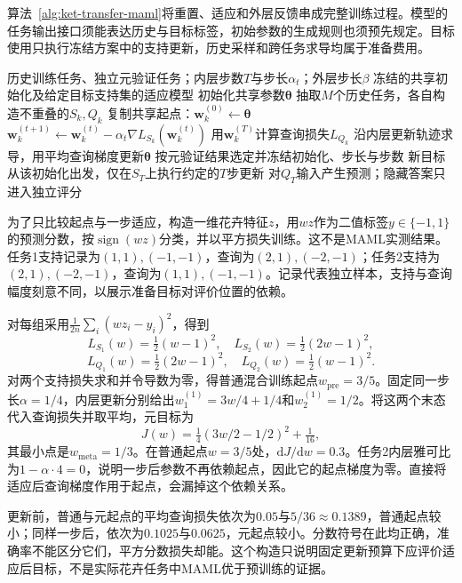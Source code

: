 算法~\ref{alg:ket-transfer-maml}将重置、适应和外层反馈串成完整训练过程。模型的任务输出接口须能表达历史与目标标签，初始参数的生成规则也须预先规定。目标使用只执行冻结方案中的支持更新，历史采样和跨任务求导均属于准备费用。

\begin{algorithm}[MAML的准备与目标适应]
  \label{alg:ket-transfer-maml}
  \begin{algorithmic}[1]
    \Require 历史训练任务、独立元验证任务；内层步数$T$与步长$\alpha_t$；外层步长$\beta$
    \Ensure 冻结的共享初始化及给定目标支持集的适应模型
    \State 初始化共享参数$\bm{\theta}$
      \State 抽取$M$个历史任务，各自构造不重叠的$S_k,Q_k$
        \State 复制共享起点：$\bm w_k^{(0)}\gets\bm{\theta}$
          \State $\bm w_k^{(t+1)}\gets\bm w_k^{(t)}
            -\alpha_t\nabla L_{S_k}(\bm w_k^{(t)})$
        \EndFor
        \State 用$\bm w_k^{(T)}$计算查询损失$L_{Q_k}$
      \EndFor
      \State 沿内层更新轨迹求导，用平均查询梯度更新$\bm{\theta}$
    \EndWhile
    \State 按元验证结果选定并冻结初始化、步长与步数
    \State 新目标从该初始化出发，仅在$S_T$上执行约定的$T$步更新
    \State 对$Q_T$输入产生预测；隐藏答案只进入独立评分
  \end{algorithmic}
\end{algorithm}

\begin{example}[同一组分类任务中的起点与适应后损失]
  \label{ex:ket-transfer-maml-numeric}
  为了只比较起点与一步适应，构造一维花卉特征$z$，用$wz$作为二值标签$y\in\{-1,1\}$的预测分数，按$\operatorname{sign}(wz)$分类，并以平方损失训练。这不是MAML实测结果。任务1支持记录为$(1,1),(-1,-1)$，查询为$(2,1),(-2,-1)$；任务2支持为$(2,1),(-2,-1)$，查询为$(1,1),(-1,-1)$。记录代表独立样本，支持与查询幅度刻意不同，以展示准备目标对评价位置的依赖。

  对每组采用$\frac{1}{2n}\sum_i(wz_i-y_i)^2$，得到
  \[
    L_{S_1}(w)=\tfrac12(w-1)^2,\quad
    L_{S_2}(w)=\tfrac12(2w-1)^2,
  \]
  \[
    L_{Q_1}(w)=\tfrac12(2w-1)^2,\quad
    L_{Q_2}(w)=\tfrac12(w-1)^2.
  \]
  对两个支持损失求和并令导数为零，得普通混合训练起点$w_{\mathrm{pre}}=3/5$。固定同一步长$\alpha=1/4$，内层更新分别给出$w_1^{(1)}=3w/4+1/4$和$w_2^{(1)}=1/2$。将这两个末态代入查询损失并取平均，元目标为
  \[
    J(w)=\tfrac14(3w/2-1/2)^2+\tfrac1{16},
  \]
  其最小点是$w_{\mathrm{meta}}=1/3$。在普通起点$w=3/5$处，$\mathrm dJ/\mathrm dw=0.3$。任务2内层雅可比为$1-\alpha\cdot4=0$，说明一步后参数不再依赖起点，因此它的起点梯度为零。直接将适应后查询梯度作用于起点，会漏掉这个依赖关系。

  更新前，普通与元起点的平均查询损失依次为$0.05$与$5/36\approx0.1389$，普通起点较小；同样一步后，依次为$0.1025$与$0.0625$，元起点较小。分数符号在此均正确，准确率不能区分它们，平方分数损失却能。这个构造只说明固定更新预算下应评价适应后目标，不是实际花卉任务中MAML优于预训练的证据。
\end{example}

